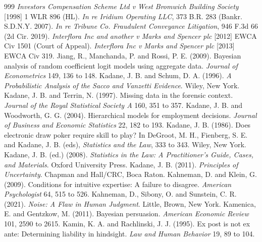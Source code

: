 \begin{thebibliography}{999}
 \emph{Investors Compensation Scheme Ltd v West Bromwich Building Society} [1998] 1 WLR 896 (HL).
 \emph{In re Iridium Operating LLC}, 373 B.R. 283 (Bankr. S.D.N.Y. 2007).
 \emph{In re Tribune Co. Fraudulent Conveyance Litigation}, 946 F.3d 66 (2d Cir. 2019).
 \emph{Interflora Inc and another v Marks and Spencer plc} [2012] EWCA Civ 1501 (Court of Appeal).
 \emph{Interflora Inc v Marks and Spencer plc} [2013] EWCA Civ 319.
 Jiang, R., Manchanda, P. and Rossi, P. E. (2009). Bayesian analysis of random coefficient logit models using aggregate data. \emph{Journal of Econometrics} 149, 136 to 148.
 Kadane, J. B. and Schum, D. A. (1996). \emph{A Probabilistic Analysis of the Sacco and Vanzetti Evidence}. Wiley, New York.
 Kadane, J. B. and Terrin, N. (1997). Missing data in the forensic context. \emph{Journal of the Royal Statistical Society A} 160, 351 to 357.
 Kadane, J. B. and Woodworth, G. G. (2004). Hierarchical models for employment decisions. \emph{Journal of Business and Economic Statistics} 22, 182 to 193.
 Kadane, J. B. (1986). Does electronic draw poker require skill to play? In DeGroot, M. H., Fienberg, S. E. and Kadane, J. B. (eds), \emph{Statistics and the Law}, 333 to 343. Wiley, New York.
 Kadane, J. B. (ed.) (2008). \emph{Statistics in the Law: A Practitioner's Guide, Cases, and Materials}. Oxford University Press.
 Kadane, J. B. (2011). \emph{Principles of Uncertainty}. Chapman and Hall/CRC, Boca Raton.
 Kahneman, D. and Klein, G. (2009). Conditions for intuitive expertise: A failure to disagree. \emph{American Psychologist} 64, 515 to 526.
 Kahneman, D., Sibony, O. and Sunstein, C. R. (2021). \emph{Noise: A Flaw in Human Judgment}. Little, Brown, New York.
 Kamenica, E. and Gentzkow, M. (2011). Bayesian persuasion. \emph{American Economic Review} 101, 2590 to 2615.
 Kamin, K. A. and Rachlinski, J. J. (1995). Ex post is not ex ante: Determining liability in hindsight. \emph{Law and Human Behavior} 19, 89 to 104.

\end{thebibliography}
